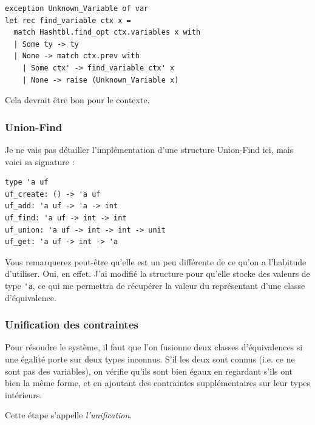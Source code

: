 \documentclass[11pt]{article}
\begin{document}
\begin{lstlisting}
exception Unknown_Variable of var
let rec find_variable ctx x =
  match Hashtbl.find_opt ctx.variables x with
  | Some ty -> ty
  | None -> match ctx.prev with
    | Some ctx' -> find_variable ctx' x
    | None -> raise (Unknown_Variable x)
\end{lstlisting}

Cela devrait être bon pour le contexte.

\newpage
\subsubsection{Union-Find}

Je ne vais pas détailler l'implémentation d'une structure Union-Find ici, mais voici sa signature :
\begin{lstlisting}
type 'a uf
uf_create: () -> 'a uf
uf_add: 'a uf -> 'a -> int
uf_find: 'a uf -> int -> int
uf_union: 'a uf -> int -> int -> unit
uf_get: 'a uf -> int -> 'a
\end{lstlisting}

Vous remarquerez peut-être qu'elle est un peu différente de ce qu'on a l'habitude d'utiliser. Oui, en effet. J'ai modifié la structure pour qu'elle stocke des valeurs de type \verb|'a|, ce qui me permettra de récupérer la valeur du représentant d'une classe d'équivalence.

\subsubsection{Unification des contraintes}

Pour résoudre le système, il faut que l'on fusionne deux classes d'équivalences si une égalité porte sur deux types inconnus. S'il les deux sont connus (i.e. ce ne sont pas des variables), on vérifie qu'ils sont bien égaux en regardant s'ils ont bien la même forme, et en ajoutant des contraintes supplémentaires sur leur types intérieurs. 

Cette étape s'appelle \textit{l'unification}.
\end{document}

